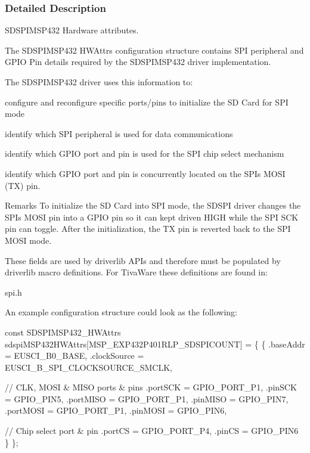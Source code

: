 \subsubsection{Detailed Description}
S\+D\+S\+P\+I\+M\+S\+P432 Hardware attributes. 

The S\+D\+S\+P\+I\+M\+S\+P432 H\+W\+Attrs configuration structure contains S\+P\+I peripheral and G\+P\+I\+O Pin details required by the S\+D\+S\+P\+I\+M\+S\+P432 driver implementation.

The S\+D\+S\+P\+I\+M\+S\+P432 driver uses this information to\+:
\begin{DoxyItemize}
\item configure and reconfigure specific ports/pins to initialize the S\+D Card for S\+P\+I mode
\item identify which S\+P\+I peripheral is used for data communications
\item identify which G\+P\+I\+O port and pin is used for the S\+P\+I chip select mechanism
\item identify which G\+P\+I\+O port and pin is concurrently located on the S\+P\+I\textquotesingle{}s M\+O\+S\+I (T\+X) pin.
\end{DoxyItemize}

\begin{DoxyRemark}{Remarks}
To initialize the S\+D Card into S\+P\+I mode, the S\+D\+S\+P\+I driver changes the S\+P\+I\textquotesingle{}s M\+O\+S\+I pin into a G\+P\+I\+O pin so it can kept driven H\+I\+G\+H while the S\+P\+I S\+C\+K pin can toggle. After the initialization, the T\+X pin is reverted back to the S\+P\+I M\+O\+S\+I mode.
\end{DoxyRemark}
These fields are used by driverlib A\+P\+Is and therefore must be populated by driverlib macro definitions. For Tiva\+Ware these definitions are found in\+:
\begin{DoxyItemize}
\item spi.\+h
\end{DoxyItemize}

An example configuration structure could look as the following\+: 
\begin{DoxyCode}
\textcolor{keyword}{const} SDSPIMSP432_HWAttrs sdspiMSP432HWAttrs[MSP\_EXP432P401RLP\_SDSPICOUNT] = \{
    \{
        .baseAddr = EUSCI\_B0\_BASE,
        .clockSource = EUSCI\_B\_SPI\_CLOCKSOURCE\_SMCLK,

        \textcolor{comment}{// CLK, MOSI & MISO ports & pins}
        .portSCK = GPIO\_PORT\_P1,
        .pinSCK = GPIO\_PIN5,
        .portMISO = GPIO\_PORT\_P1,
        .pinMISO = GPIO\_PIN7,
        .portMOSI = GPIO\_PORT\_P1,
        .pinMOSI = GPIO\_PIN6,

        \textcolor{comment}{// Chip select port & pin}
        .portCS = GPIO\_PORT\_P4,
        .pinCS = GPIO\_PIN6
    \}
\};
\end{DoxyCode}
 

